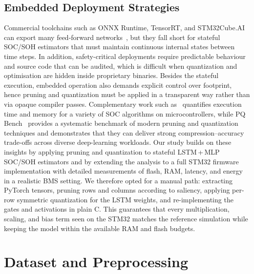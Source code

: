 \documentclass[review]{elsarticle}
\begin{document}
\subsection{Embedded Deployment Strategies}
Commercial toolchains such as ONNX Runtime, TensorRT, and STM32Cube.AI can export many feed-forward networks~\cite{ONNXRuntimeHighperformance,NVIDIATensorRTHighPerformance,XCUBEAISTM32CubeExpansion}, but they fall short for stateful SOC/SOH estimators that must maintain continuous internal states between time steps. In addition, safety-critical deployments require predictable behaviour and source code that can be audited, which is difficult when quantization and optimisation are hidden inside proprietary binaries. Besides the stateful execution, embedded operation also demands explicit control over footprint, hence pruning and quantization must be applied in a transparent way rather than via opaque compiler passes. Complementary work such as~\cite{naguibMicroprocessorExecutionTime2022} quantifies execution time and memory for a variety of SOC algorithms on microcontrollers, while PQ Bench~\cite{schulzePQBenchBenchmarking2025} provides a systematic benchmark of modern pruning and quantization techniques and demonstrates that they can deliver strong compression--accuracy trade-offs across diverse deep-learning workloads. Our study builds on these insights by applying pruning and quantization to stateful LSTM\,+\,MLP SOC/SOH estimators and by extending the analysis to a full STM32 firmware implementation with detailed measurements of flash, RAM, latency, and energy in a realistic BMS setting. We therefore opted for a manual path: extracting PyTorch tensors, pruning rows and columns according to saliency, applying per-row symmetric quantization for the LSTM weights, and re-implementing the gates and activations in plain C. This guarantees that every multiplication, scaling, and bias term seen on the STM32 matches the reference simulation while keeping the model within the available RAM and flash budgets.
\section{Dataset and Preprocessing}
\end{document}
